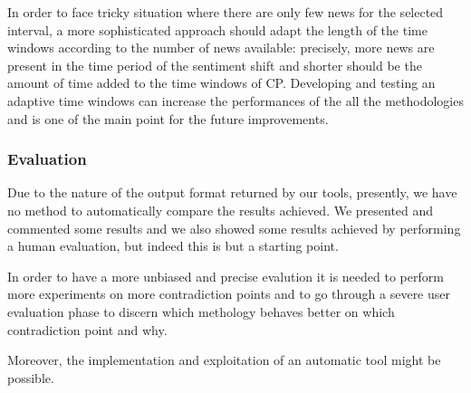 In order to face tricky situation where there are only few news for the selected interval, a more sophisticated approach should adapt the length of the time windows according to the number of news available:
precisely, more news are present in the time period of the sentiment shift and shorter should be the amount of time added to the time windows of CP.
Developing and testing an adaptive time windows can increase the performances of the all the methodologies and is one of the main point for the future improvements.

\subsubsection*{Evaluation}
Due to the nature of the output format returned by our tools, presently, we have
no method to automatically compare the results achieved. We presented and
commented some results and we also showed some results achieved by performing a
human evaluation, but indeed this is but a starting point.

In order to have a more unbiased and precise evalution it is needed to perform
more experiments on more contradiction points and to go through a severe user
evaluation phase to discern which methology behaves better on which
contradiction point and why.

Moreover, the implementation and exploitation of an automatic tool might be
possible.

